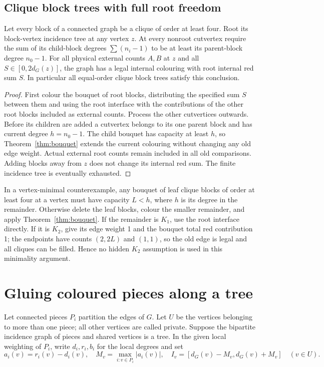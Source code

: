 \subsection{Clique block trees with full root freedom}

\begin{theorem}[A7]\label{thm:cliquetree}
Let every block of a connected graph be a clique of order at least
four. Root its block-vertex incidence tree at any vertex $z$.
At every nonroot cutvertex require the sum of its child-block degrees
$\sum(n_i-1)$ to be at least its parent-block degree $n_0-1$.
For all physical external counts $A,B$ at $z$ and all
$S\in[0,2d_G(z)]$, the graph has a legal internal colouring with
root internal red sum $S$. In particular all equal-order clique
block trees satisfy this conclusion.
\end{theorem}
\begin{proof}
First colour the bouquet of root blocks, distributing the specified
sum $S$ between them and using the root interface with the contributions
of the other root blocks included as external counts. Process the
other cutvertices outwards. Before its children are added a cutvertex
belongs to its one parent block and has current degree $h=n_0-1$.
The child bouquet has capacity at least $h$, so
Theorem~\ref{thm:bouquet} extends the current colouring without changing
any old edge weight. Actual external root counts remain included in
all old comparisons. Adding blocks away from $z$ does not change
its internal red sum. The finite incidence tree is eventually exhausted.
\end{proof}

In a vertex-minimal counterexample, any bouquet of leaf clique blocks
of order at least four at a vertex must have capacity $L<h$, where
$h$ is its degree in the remainder. Otherwise delete the leaf blocks,
colour the smaller remainder, and apply Theorem~\ref{thm:bouquet}.
If the remainder is $K_1$, use the root interface directly. If it
is $K_2$, give its edge weight 1 and the bouquet total red contribution
1; the endpoints have counts $(2,2L)$ and $(1,1)$, so the old edge
is legal and all cliques can be filled. Hence no hidden $K_2$
assumption is used in this minimality argument.

\section{Gluing coloured pieces along a tree}\label{sec:pieceglue}

Let connected pieces $P_i$ partition the edges of $G$. Let $U$ be
the vertices belonging to more than one piece; all other vertices
are called private. Suppose the bipartite incidence graph of pieces
and shared vertices is a tree. In the given local weighting of $P_i$,
write $d_i,r_i,b_i$ for the local degrees and set
\[
 a_i(v)=r_i(v)-d_i(v),\quad
 M_v=\max_{i:v\in P_i}|a_i(v)|,\quad
 I_v=[d_G(v)-M_v,d_G(v)+M_v]\quad(v\in U).
\]

